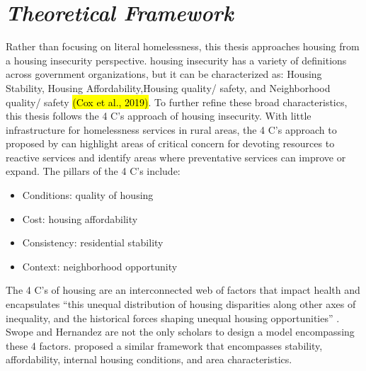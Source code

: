 \section{\textit{Theoretical Framework}}
Rather than focusing on literal homelessness, this thesis approaches housing from a housing insecurity perspective. housing insecurity has a variety of definitions across government organizations, but it can be characterized as: Housing Stability, Housing Affordability,Housing quality/ safety, and Neighborhood quality/ safety \hl{(Cox et al., 2019)}. To further refine these broad characteristics, this thesis follows the 4 C's approach of housing insecurity. With little infrastructure for homelessness services in rural areas, the 4 C’s approach to \hs proposed by \citet{swope_housing_2020} can highlight areas of critical concern for devoting resources to reactive services and identify areas where preventative services can improve or expand. The pillars of the 4 C's include:
\begin{itemize}
    \item{Conditions: quality of housing}
    \item{Cost: housing affordability}
    \item{Consistency: residential stability}
    \item{Context: neighborhood opportunity }
\end{itemize}
The 4 C’s of housing are an interconnected web of factors that impact health and encapsulates “this unequal distribution of housing disparities along other axes of inequality, and the historical forces shaping unequal housing opportunities” \citep[1]{hernandez_housing_2019}. Swope and Hernandez are not the only scholars to design a model encompassing these 4 factors. \citet{metzger_fair_2017} proposed a similar framework that encompasses stability, affordability, internal housing conditions, and area characteristics. 



